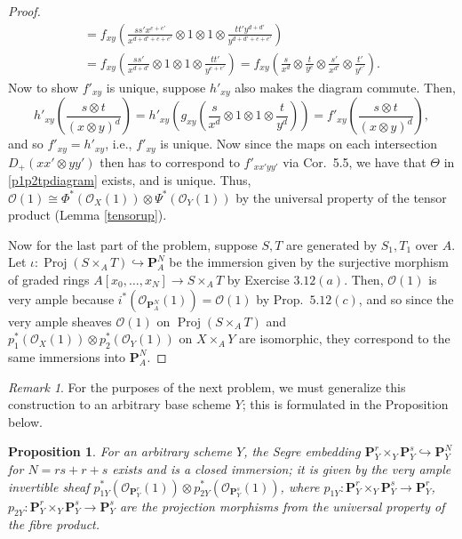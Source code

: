 \documentclass[10pt]{article}
\newtheorem{proposition}{Proposition}
\theoremstyle{definition}
\theoremstyle{remark}
\newtheorem*{remark}{Remark}
\numberwithin{equation}{section}
\numberwithin{figure}{subsubsection}
\DeclareMathOperator{\Proj}{Proj}
\newcommand{\OO}{\mathcal{O}}
\begin{document}
\begin{proof}
\begin{multline*}
    = f_{xy}\left( \frac{ss'x^{e+e'}}{x^{d+d'+e+e'}} \otimes 1 \otimes 1 \otimes \frac{tt'y^{d+d'}}{y^{d+d'+e+e'}} \right)\\
    = f_{xy}\left( \frac{ss'}{x^{d+d'}} \otimes 1 \otimes 1 \otimes \frac{tt'}{y^{e+e'}} \right) = f_{xy}\left( \frac{s}{x^{d}} \otimes \frac{t}{y^e}\otimes\frac{s'}{x^{d'}}\otimes\frac{t'}{y^{e'}} \right).
  \end{multline*}
  Now to show $f'_{xy}$ is unique, suppose $h'_{xy}$ also makes the diagram commute. Then,
  \begin{equation*}
    h'_{xy}\left( \frac{s \otimes t}{(x \otimes y)^{d}} \right) = h'_{xy}\left( g_{xy}\left( \frac{s}{x^d} \otimes 1 \otimes 1 \otimes \frac{t}{y^d} \right)\right) = f'_{xy}\left( \frac{s \otimes t}{(x \otimes y)^{d}} \right),
  \end{equation*}
  and so $f'_{xy} = h'_{xy}$, i.e., $f'_{xy}$ is unique. Now since the maps on each intersection $D_+(xx' \otimes yy')$ then has to correspond to $f'_{xx'yy'}$ via Cor.~5.5, we have that $\Theta$ in \eqref{p1p2tpdiagram} exists, and is unique. Thus, $\OO(1) \cong \Phi^*(\OO_X(1)) \otimes \Psi^*(\OO_Y(1))$ by the universal property of the tensor product (Lemma \ref{tensorup}).
  \par Now for the last part of the problem, suppose $S,T$ are generated by
  $S_1,T_1$ over $A$. Let $\iota\colon \Proj(S \times_A T) \hookrightarrow
  \mathbf{P}^N_A$ be the immersion given by the surjective morphism of graded
  rings $A[x_0,\ldots,x_N] \to S \times_A T$ by Exercise $3.12(a)$. Then, $\OO(1)$ is very ample because $i^*(\OO_{\mathbf{P}^N_A}(1)) = \OO(1)$ by Prop.~$5.12(c)$, and so since the very ample sheaves $\OO(1)$ on $\Proj(S \times_A T)$ and $p_1^*(\OO_X(1)) \otimes p_2^*(\OO_Y(1))$ on $X \times_A Y$ are isomorphic, they correspond to the same immersions into $\mathbf{P}^N_A$.
\end{proof}
\begin{remark}
  For the purposes of the next problem, we must generalize this construction to an arbitrary base scheme $Y$; this is formulated in the Proposition below.
\end{remark}
\begin{proposition}\label{segre}
  For an arbitrary scheme $Y$, the Segre embedding $\mathbf{P}_Y^r \times_Y \mathbf{P}_Y^s \hookrightarrow \mathbf{P}_Y^N$ for $N = rs + r + s$ exists and is a closed immersion; it is given by the very ample invertible sheaf $p_{1Y}^*(\OO_{\mathbf{P}_Y^r}(1)) \otimes p_{2Y}^*(\OO_{\mathbf{P}_Y^s}(1))$, where $p_{1Y}\colon\mathbf{P}_Y^r \times_Y \mathbf{P}_Y^s \to \mathbf{P}_Y^r$, $p_{2Y}\colon\mathbf{P}_Y^r \times_Y \mathbf{P}_Y^s \to \mathbf{P}_Y^s$ are the projection morphisms from the universal property of the fibre product.
\end{proposition}
\end{document}
